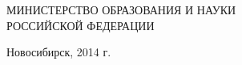 \documentclass[a4paper]{article}
\begin{document}
	\begin{titlepage}
		\begin{center}
		\large
		МИНИСТЕРСТВО ОБРАЗОВАНИЯ И НАУКИ\\ РОССИЙСКОЙ ФЕДЕРАЦИИ
		\end{center}
		\vfill

		\begin{center}
  		Новосибирск, 2014 г.
  		\end{center}


	\end{titlepage}
\end{document}
